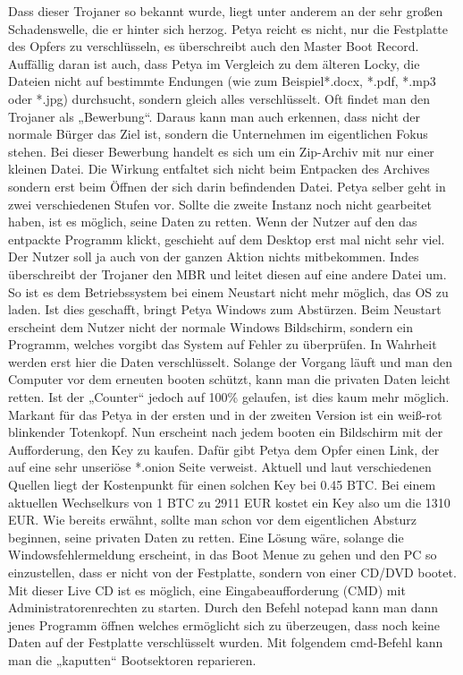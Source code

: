 Dass dieser Trojaner so bekannt wurde, liegt unter anderem an der sehr großen Schadenswelle, die er hinter sich herzog. Petya reicht es nicht, nur die Festplatte des Opfers zu verschlüsseln, es überschreibt auch den Master Boot Record. Auffällig daran ist auch, dass Petya im Vergleich zu dem älteren Locky, die Dateien nicht auf bestimmte Endungen (wie zum Beispiel*.docx, *.pdf, *.mp3 oder *.jpg) durchsucht, sondern gleich alles verschlüsselt. Oft findet man den Trojaner als „Bewerbung“. Daraus kann man auch erkennen, dass nicht der normale Bürger das Ziel ist, sondern die Unternehmen im eigentlichen Fokus stehen. Bei dieser Bewerbung handelt es sich um ein Zip-Archiv mit nur einer kleinen Datei. Die Wirkung entfaltet sich nicht beim Entpacken des Archives sondern erst beim Öffnen der sich darin befindenden Datei. Petya selber geht in zwei verschiedenen Stufen vor. Sollte die zweite Instanz noch nicht gearbeitet haben, ist es möglich, seine Daten zu retten. Wenn der Nutzer auf den das entpackte Programm klickt, geschieht auf dem Desktop erst mal nicht sehr viel. Der Nutzer soll ja auch von der ganzen Aktion nichts mitbekommen. Indes überschreibt der Trojaner den MBR und leitet diesen auf eine andere Datei um. So ist es dem Betriebssystem bei einem Neustart nicht mehr möglich, das OS zu laden. Ist dies geschafft, bringt Petya Windows zum Abstürzen. Beim Neustart erscheint dem Nutzer nicht der normale Windows Bildschirm, sondern ein Programm, welches vorgibt das System auf Fehler zu überprüfen. In Wahrheit werden erst hier die Daten verschlüsselt. Solange der Vorgang läuft und man den Computer vor dem erneuten booten schützt, kann man die privaten Daten leicht retten. Ist der „Counter“ jedoch auf 100\% gelaufen, ist dies kaum mehr möglich. Markant für das Petya in der ersten und in der zweiten Version ist ein weiß-rot blinkender Totenkopf. Nun erscheint nach jedem booten ein Bildschirm mit der Aufforderung, den Key zu kaufen. Dafür gibt Petya dem Opfer einen Link, der auf eine sehr unseriöse *.onion Seite verweist. Aktuell und laut verschiedenen Quellen liegt der Kostenpunkt für einen solchen Key bei 0.45 BTC. Bei einem aktuellen Wechselkurs von 1 BTC zu 2911 EUR kostet ein Key also um die 1310 EUR. Wie bereits erwähnt, sollte man schon vor dem eigentlichen Absturz beginnen, seine privaten Daten zu retten. Eine Lösung wäre, solange die Windowsfehlermeldung erscheint, in das Boot Menue zu gehen und den PC so einzustellen, dass er nicht von der Festplatte, sondern von einer CD/DVD bootet. Mit dieser Live CD ist es möglich, eine Eingabeaufforderung (CMD) mit Administratorenrechten zu starten. Durch den Befehl notepad kann man dann jenes Programm öffnen welches ermöglicht sich zu überzeugen, dass noch keine Daten auf der Festplatte verschlüsselt wurden. Mit folgendem cmd-Befehl kann man die „kaputten“ Bootsektoren reparieren.

